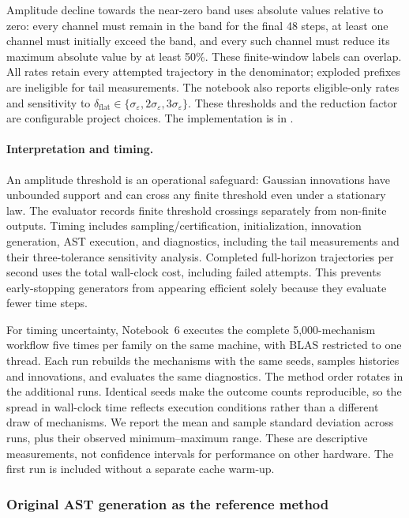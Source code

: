 Amplitude decline towards the near-zero band uses absolute values relative
to zero: every channel must remain in the band for the final 48 steps,
at least one channel must initially exceed the band, and every such channel
must reduce its maximum absolute value by at least 50\%. These finite-window
labels can overlap. All rates retain every attempted trajectory in the
denominator; exploded prefixes are ineligible for tail measurements.
The notebook also reports eligible-only rates and sensitivity to
$\delta_{\mathrm{flat}}\in\{\sigma_\varepsilon,2\sigma_\varepsilon,
3\sigma_\varepsilon\}$. These thresholds and the reduction factor are
configurable project choices. The implementation is in
.

\paragraph{Interpretation and timing.}
An amplitude threshold is an operational safeguard: Gaussian innovations have
unbounded support and can cross any finite threshold even under a stationary
law. The evaluator records finite threshold crossings separately from
non-finite outputs. Timing includes sampling/certification, initialization,
innovation generation, AST execution, and diagnostics,
including the tail measurements and their three-tolerance sensitivity analysis.
Completed full-horizon trajectories per second uses the total wall-clock
cost, including failed attempts. This prevents early-stopping generators
from appearing efficient solely because they evaluate fewer time steps.

For timing uncertainty, Notebook~6 executes the complete 5,000-mechanism
workflow five times per family on the same machine, with BLAS restricted to
one thread. Each run rebuilds the mechanisms with the same seeds, samples
histories and innovations, and evaluates the same diagnostics. The method
order rotates in the additional runs. Identical seeds make the outcome counts
reproducible, so the spread in wall-clock time reflects execution conditions
rather than a different draw of mechanisms. We report the mean and sample
standard deviation across runs, plus their observed minimum--maximum range.
These are descriptive measurements, not confidence intervals for performance
on other hardware. The first run is included without a separate cache warm-up.

\subsubsection{Original AST generation as the reference method}
\label{sec:implemented-original-baseline}


